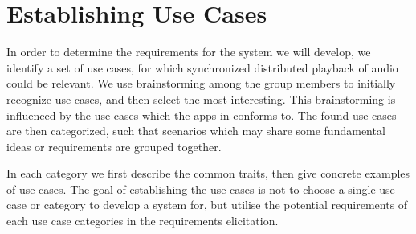 \chapter{Establishing Use Cases}
\label{cha:establishing_use_cases}
In order to determine the requirements for the system we will develop, we identify a set of use cases, for which synchronized distributed playback of audio could be relevant.
We use brainstorming among the group members to initially recognize use cases, and then select the most interesting.
This brainstorming is influenced by the use cases which the apps in  conforms to.
The found use cases are then categorized, such that scenarios which may share some fundamental ideas or requirements are grouped together.

In each category we first describe the common traits, then give concrete examples of use cases.
The goal of establishing the use cases is not to choose a single use case or category to develop a system for, but utilise the potential requirements of each use case categories in the requirements elicitation.
